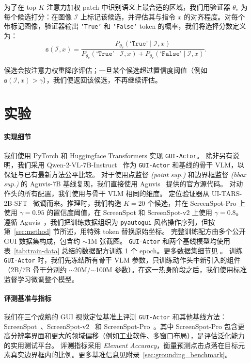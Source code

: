 \documentclass{article}
\newcommand{\sys}{\texttt{GUI-Actor}\xspace}
\begin{document}
为了在 top-$K$ 注意力加权 patch 中识别语义上最合适的区域，我们用验证器 $\theta_v$ 为每个候选打分：在图像 $\mathcal{I}$ 上标记该候选，并评估其与指令 $x$ 的对齐程度。对每个带标记图像，验证器输出 \texttt{`True'} 和 \texttt{`False'} token 的概率，我们将选择分数定义为：
\begin{equation}
\texttt{s}(\mathcal{I}, x) = \frac{P_{\theta_v}(\texttt{`True'} \mid \mathcal{I}, x)}{P_{\theta_v}(\texttt{`True'} \mid \mathcal{I}, x) + P_{\theta_v}(\texttt{`False'} \mid \mathcal{I}, x)}.
\end{equation}

候选会按注意力权重降序评估；一旦某个候选超过置信度阈值（例如 $\texttt{s}(\mathcal{I}, x) > \gamma$），我们便返回该候选，不再继续评估。

\section{实验}

\paragraph{实现细节}
我们使用 PyTorch 和 Huggingface Transformers 实现 \sys。
除非另有说明，我们采用 Qwen-2-VL-7B-Instruct~\cite{wang2024qwen2} 作为 \sys 和基线的骨干 VLM，以保证与已有最新方法公平比较。
对于使用点监督 \textit{(point sup.)} 和边界框监督 \textit{(bbox sup.)} 的 Aguvis-7B 基线复现，我们直接使用 Aguvis~\cite{xu2024aguvis} 提供的官方源代码。
对动作头的所有配置，我们使用与骨干 VLM 相同的维度。
定位验证器从 UI-TARS-2B-SFT~\cite{qin2025ui} 微调而来。推理时，我们构造 $K=20$ 个候选，并在 ScreenSpot-Pro 上使用 $\gamma=0.95$ 的置信度阈值，在 ScreenSpot 和 ScreenSpot-v2 上使用 $\gamma=0.8$。
遵循 Aguvis~\citep{xu2024aguvis}，我们把训练数据组织为 \texttt{pyautogui} 风格操作序列，但按第~\ref{sec:method} 节所述，用特殊 token 替换原始坐标。
完整训练配方由多个公开 GUI 数据集构成，包含约 $\sim$1M 张截图。
\sys 和两个基线模型均使用表~\ref{tab:train-data} 总结的数据配方训练 1 个 epoch。更多数据集细节见 。
训练 \sys 时，我们先冻结所有骨干 VLM 参数，只训练动作头中新引入的组件（2B/7B 骨干分别约 $\sim$20M/$\sim$100M 参数）。在这一热身阶段之后，我们使用标准监督学习微调整个模型。

\paragraph{评测基准与指标}
我们在三个成熟的 GUI 视觉定位基准上评测 \sys 和其他基线方法：ScreenSpot~\cite{cheng2024seeclick}、ScreenSpot-v2~\cite{wu2024atlas} 和 ScreenSpot-Pro~\cite{li2025screenspot}。其中 ScreenSpot-Pro 包含更高分辨率界面和更大的领域偏移（例如工业软件、多窗口布局），是评估泛化能力的实用测试平台。
评测指标采用 \textit{Element Accuracy}，衡量预测点击点落在目标元素真实边界框内的比例。更多基准信息见附录~\ref{sec:grounding_benchmark}。
\end{document}
